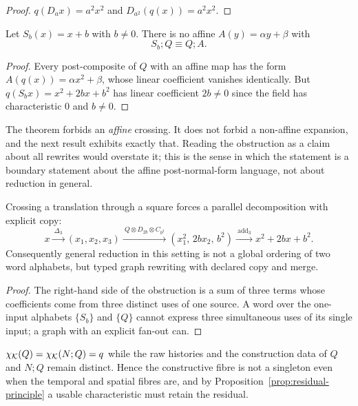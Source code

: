 \begin{proof}
$q(D_a x)=a^{2}x^{2}$ and $D_{a^{2}}(q(x))=a^{2}x^{2}$.
\end{proof}

\begin{theorem}\label{thm:translation-obstruction}
Let $S_b(x)=x+b$ with $b\neq0$.  There is no affine $A(y)=\alpha y+\beta$ with
\[
  S_b;Q\equiv Q;A .
\]
\end{theorem}

\begin{proof}
Every post-composite of $Q$ with an affine map has the form
$A(q(x))=\alpha x^{2}+\beta$, whose linear coefficient vanishes identically.  But
$q(S_b x)=x^{2}+2bx+b^{2}$ has linear coefficient $2b\neq0$ since the field has
characteristic $0$ and $b\neq0$.
\end{proof}

\begin{remark}
\label{rem:obstruction-scope}
The theorem forbids an \emph{affine} crossing.  It does not forbid a non-affine
expansion, and the next result exhibits exactly that.  Reading the obstruction as a
claim about all rewrites would overstate it; this is the sense in which the statement
is a boundary statement about the affine post-normal-form language, not about
reduction in general.
\end{remark}

\begin{proposition}\label{prop:word-to-graph}
Crossing a translation through a square forces a parallel decomposition with explicit
copy:
\[
  x\xrightarrow{\ \Delta_3\ } (x_1,x_2,x_3)
  \xrightarrow{\ Q\otimes D_{2b}\otimes C_{b^{2}}\ } (x_1^{2},\,2bx_2,\,b^{2})
  \xrightarrow{\ \mathrm{add}_3\ } x^{2}+2bx+b^{2}.
\]
Consequently general reduction in this setting is not a global ordering of two word
alphabets, but typed graph rewriting with declared copy and merge.
\end{proposition}

\begin{proof}
The right-hand side of the obstruction is a sum of three terms whose coefficients come
from three distinct uses of one source.  A word over the one-input alphabets $\{S_b\}$
and $\{Q\}$ cannot express three simultaneous uses of its single input; a graph with an
explicit fan-out can.
\end{proof}

\begin{calibration}\label{cal:constructive-fibre}
$\chi_\mathcal K(Q)=\chi_\mathcal K(N;Q)=q$ while the raw histories and the construction data of $Q$
and $N;Q$ remain distinct.  Hence the constructive fibre is not a singleton even when
the temporal and spatial fibres are, and by
Proposition~\ref{prop:residual-principle} a usable characteristic must retain the
residual.
\end{calibration}

